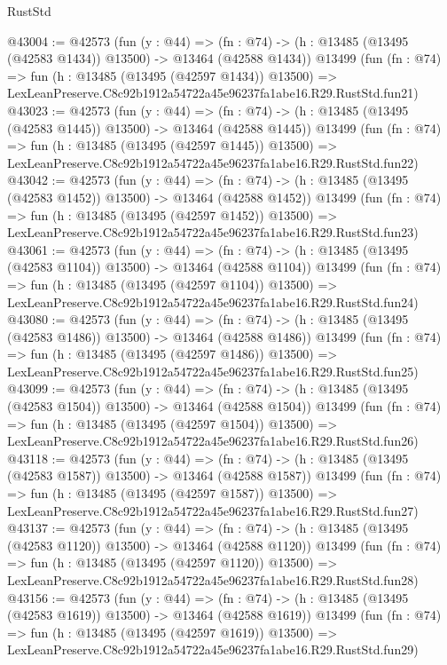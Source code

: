 \begin{lexlean}{RustStd}
\begin{coremodule}
@43004 := @42573
    (fun (y : @44) =>
    (fn : @74) -> (h : @13485 (@13495 (@42583 @1434)) @13500) -> @13464 (@42588 @1434))
    @13499
    (fun (fn : @74) =>
    fun (h : @13485 (@13495 (@42597 @1434)) @13500) =>
    LexLeanPreserve.C8c92b1912a54722a45e96237fa1abe16.R29.RustStd.fun21)
@43023 := @42573
    (fun (y : @44) =>
    (fn : @74) -> (h : @13485 (@13495 (@42583 @1445)) @13500) -> @13464 (@42588 @1445))
    @13499
    (fun (fn : @74) =>
    fun (h : @13485 (@13495 (@42597 @1445)) @13500) =>
    LexLeanPreserve.C8c92b1912a54722a45e96237fa1abe16.R29.RustStd.fun22)
@43042 := @42573
    (fun (y : @44) =>
    (fn : @74) -> (h : @13485 (@13495 (@42583 @1452)) @13500) -> @13464 (@42588 @1452))
    @13499
    (fun (fn : @74) =>
    fun (h : @13485 (@13495 (@42597 @1452)) @13500) =>
    LexLeanPreserve.C8c92b1912a54722a45e96237fa1abe16.R29.RustStd.fun23)
@43061 := @42573
    (fun (y : @44) =>
    (fn : @74) -> (h : @13485 (@13495 (@42583 @1104)) @13500) -> @13464 (@42588 @1104))
    @13499
    (fun (fn : @74) =>
    fun (h : @13485 (@13495 (@42597 @1104)) @13500) =>
    LexLeanPreserve.C8c92b1912a54722a45e96237fa1abe16.R29.RustStd.fun24)
@43080 := @42573
    (fun (y : @44) =>
    (fn : @74) -> (h : @13485 (@13495 (@42583 @1486)) @13500) -> @13464 (@42588 @1486))
    @13499
    (fun (fn : @74) =>
    fun (h : @13485 (@13495 (@42597 @1486)) @13500) =>
    LexLeanPreserve.C8c92b1912a54722a45e96237fa1abe16.R29.RustStd.fun25)
@43099 := @42573
    (fun (y : @44) =>
    (fn : @74) -> (h : @13485 (@13495 (@42583 @1504)) @13500) -> @13464 (@42588 @1504))
    @13499
    (fun (fn : @74) =>
    fun (h : @13485 (@13495 (@42597 @1504)) @13500) =>
    LexLeanPreserve.C8c92b1912a54722a45e96237fa1abe16.R29.RustStd.fun26)
@43118 := @42573
    (fun (y : @44) =>
    (fn : @74) -> (h : @13485 (@13495 (@42583 @1587)) @13500) -> @13464 (@42588 @1587))
    @13499
    (fun (fn : @74) =>
    fun (h : @13485 (@13495 (@42597 @1587)) @13500) =>
    LexLeanPreserve.C8c92b1912a54722a45e96237fa1abe16.R29.RustStd.fun27)
@43137 := @42573
    (fun (y : @44) =>
    (fn : @74) -> (h : @13485 (@13495 (@42583 @1120)) @13500) -> @13464 (@42588 @1120))
    @13499
    (fun (fn : @74) =>
    fun (h : @13485 (@13495 (@42597 @1120)) @13500) =>
    LexLeanPreserve.C8c92b1912a54722a45e96237fa1abe16.R29.RustStd.fun28)
@43156 := @42573
    (fun (y : @44) =>
    (fn : @74) -> (h : @13485 (@13495 (@42583 @1619)) @13500) -> @13464 (@42588 @1619))
    @13499
    (fun (fn : @74) =>
    fun (h : @13485 (@13495 (@42597 @1619)) @13500) =>
    LexLeanPreserve.C8c92b1912a54722a45e96237fa1abe16.R29.RustStd.fun29)

\end{coremodule}
\end{lexlean}

